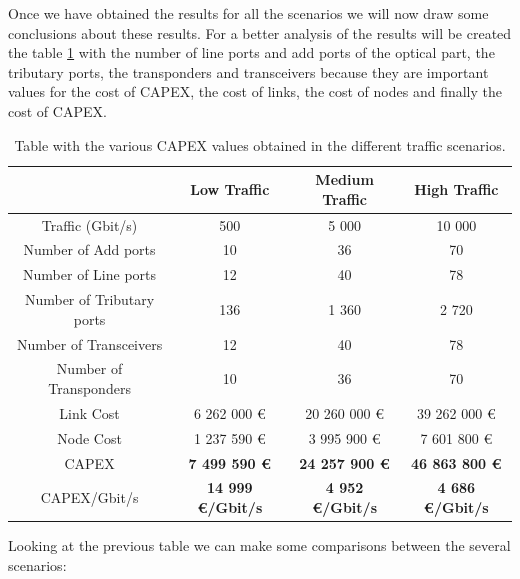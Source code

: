 Once we have obtained the results for all the scenarios we will now draw some conclusions about these results. For a better analysis of the results will be created the table \ref{table_comparative_transluc_surv} with the number of line ports and add ports of the optical part, the tributary ports, the transponders and transceivers because they are important values for the cost of CAPEX, the cost of links, the cost of nodes and finally the cost of CAPEX.\\

\begin{table}[h!]
\centering
\begin{tabular}{| c | c | c | c |}
 \hline
  & Low Traffic & Medium Traffic  & High Traffic \\
 \hline\hline
 Traffic (Gbit/s) & 500 & 5 000 & 10 000 \\ \hline
 Number of Add ports & 10 & 36 & 70 \\ \hline
 Number of Line ports & 12 & 40 & 78 \\ \hline
 Number of Tributary ports & 136 & 1 360 & 2 720 \\ \hline
 Number of Transceivers & 12 & 40 & 78 \\ \hline
 Number of Transponders & 10 & 36 & 70 \\ \hline
 Link Cost & 6 262 000 \euro & 20 260 000 \euro & 39 262 000 \euro \\ \hline
 Node Cost & 1 237 590 \euro & 3 995 900 \euro & 7 601 800 \euro \\ \hline
 CAPEX & \textbf{7 499 590 \euro} & \textbf{24 257 900 \euro} & \textbf{46 863 800 \euro} \\ \hline
 CAPEX/Gbit/s & \textbf{14 999 \euro/Gbit/s} & \textbf{4 952 \euro/Gbit/s} & \textbf{4 686 \euro/Gbit/s}\\
 \hline
\end{tabular}
\caption{Table with the various CAPEX values obtained in the different traffic scenarios.}
\label{table_comparative_transluc_surv}
\end{table}

Looking at the previous table we can make some comparisons between the several scenarios:

